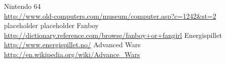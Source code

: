 \begin{thebibliography}{1} %
	Nintendo 64\\\url{http://www.old-computers.com/museum/computer.asp?c=1242&st=2}
	placeholder
	placeholder
	Fanboy\\\url{http://dictionary.reference.com/browse/fanboy+or+fangirl}
	Energispillet\\\url{http://www.energispillet.no/}
	Advanced Wars\\\url{http://en.wikipedia.org/wiki/Advance\_Wars}
\end{thebibliography}
